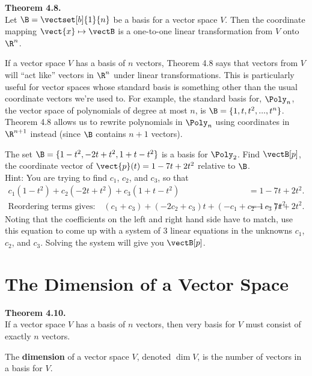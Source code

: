 \begin{boxthm}
	\textbf{Theorem 4.8.} \\
	Let $\B=\vectset[b]{1}{n}$ be a basis for a vector space $V$. Then the coordinate mapping $\vect{x}\mapsto\vectB$ is a one-to-one linear transformation from $V$ onto $\R^n$.
\end{boxthm}
\vspace{-1em}
\begin{boxme}
	If a vector space $V$ has a basis of $n$ vectors, Theorem 4.8 says that vectors from $V$ will ``act like'' vectors in $\R^n$ under linear transformations. This is particularly useful for vector spaces whose standard basis is something other than the usual coordinate vectors we're used to. For example, the standard basis for, $\Poly_n$, the vector space of polynomials of degree at most $n$, is $\B=\{1,t,t^2,...,t^n\}$. Theorem 4.8 allows us to rewrite polynomials in $\Poly_n$ using coordinates in $\R^{n+1}$ instead (since $\B$ contains $n+1$ vectors).
\end{boxme}
\begin{exercise} %
	The set $\B=\{ 1-t^2, -2t+t^2, 1+t-t^2 \}$ is a basis for $\Poly_2$. Find $\vectB[p]$, the coordinate vector of $\vect{p}(t)=1-7t+2t^2$ relative to $\B$. \\

	Hint: You are trying to find $c_1$, $c_2$, and $c_3$, so that
	\begin{align*}
	c_1(1-t^2)+c_2(-2t+t^2)+c_3(1+t-t^2) &= 1-7t+2t^2. \\
	\text{Reordering terms gives:}\quad
	(c_1+c_3) + (-2c_2+c_3)t + (-c_1+c_2-c_3)t^2 &= 1-7t+2t^2.
	\end{align*}
	Noting that the coefficients on the left and right hand side have to match, use this equation to come up with a system of 3 linear equations in the unknowns $c_1$, $c_2$, and $c_3$. Solving the system will give you $\vectB[p]$.
\end{exercise}
\vfill


\newpage


\section{The Dimension of a Vector Space}
\name[2in]


\begin{boxthm}
	\textbf{Theorem 4.10.} \\
	If a vector space $V$ has a basis of $n$ vectors, then very basis for $V$ must consist of exactly $n$ vectors.
\end{boxthm}
\vspace{-1em}
\begin{boxdef}
	The \textbf{dimension} of a vector space $V$, denoted $\dim V$, is the number of vectors in a basis for $V$.
\end{boxdef}

